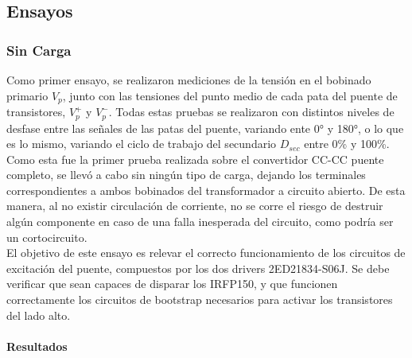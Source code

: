 \subsection{Ensayos}

\subsubsection{Sin Carga}

Como primer ensayo, se realizaron mediciones de la tensión en el bobinado primario $V_p$, junto con las tensiones del punto medio de cada pata del puente de transistores, $V_p^+$ y $V_p^-$. Todas estas pruebas se realizaron con distintos niveles de desfase entre las señales de las patas del puente, variando ente 0° y 180°, o lo que es lo mismo, variando el ciclo de trabajo del secundario $D_{sec}$ entre 0\% y 100\%.\\

Como esta fue la primer prueba realizada sobre el convertidor CC-CC puente completo, se llevó a cabo sin ningún tipo de carga, dejando los terminales correspondientes a ambos bobinados del transformador a circuito abierto. De esta manera, al no existir circulación de corriente, no se corre el riesgo de destruir algún componente en caso de una falla inesperada del circuito, como podría ser un cortocircuito.\\

El objetivo de este ensayo es relevar el correcto funcionamiento de los circuitos de excitación del puente, compuestos por los dos drivers 2ED21834-S06J. Se debe verificar que sean capaces de disparar los IRFP150, y que funcionen correctamente los circuitos de bootstrap necesarios para activar los transistores del lado alto.\\

\paragraph{Resultados}

\lipsum[1]\\


